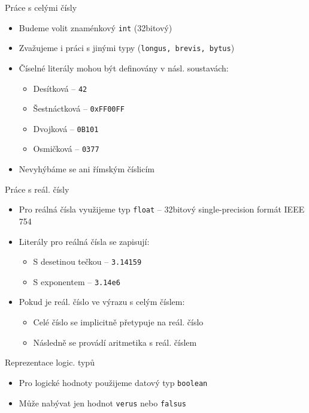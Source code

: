 \documentclass[11pt]{beamer}
\begin{document}
\begin{frame}{Práce s celými čísly}
\begin{itemize}
	\item Budeme volit znaménkový \texttt{int} (32bitový)
	\item Zvažujeme i práci s jinými typy (\texttt{longus, brevis, bytus})
	\item Číselné literály mohou být definovány v násl. soustavách:
	\begin{itemize}
		\item Desítková -- \texttt{42}
		\item Šestnáctková -- \texttt{0xFF00FF}
		\item Dvojková -- \texttt{0B101}
		\item Osmičková -- \texttt{0377}
	\end{itemize}
	\item Nevyhýbáme se ani římským číslicím 
\end{itemize}

\end{frame}
\begin{frame}{Práce s reál. čísly}
\begin{itemize}
	\item Pro reálná čísla využijeme typ \texttt{float} -- 32bitový single-precision formát IEEE 754
	\item Literály pro reálná čísla se zapisují:
	\begin{itemize}
		\item S desetinou tečkou -- \texttt{3.14159}
		\item S exponentem -- \texttt{3.14e6}
	\end{itemize}	
	\item  Pokud je reál. číslo ve výrazu s celým číslem:
	\begin{itemize}
		\item Celé číslo se implicitně přetypuje na reál. číslo
		\item Následně se provádí aritmetika s reál. číslem
	\end{itemize}
\end{itemize}
\end{frame}
\begin{frame}{Reprezentace logic. typů}
\begin{itemize}
	\item Pro logické hodnoty použijeme datový typ \texttt{boolean}
	\item Může nabývat jen hodnot \texttt{verus} nebo \texttt{falsus}
\end{itemize}
\end{frame}
\end{document}
